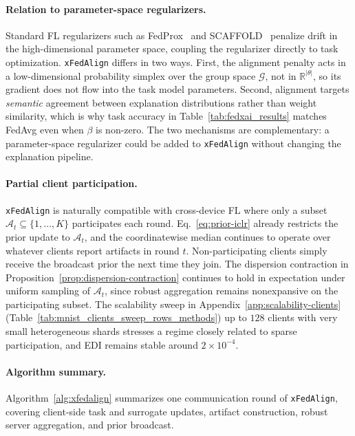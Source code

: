 \documentclass{article}
\theoremstyle{plain}
\theoremstyle{definition}
\theoremstyle{remark}
\begin{document}
\paragraph{Relation to parameter-space regularizers.}
Standard FL regularizers such as FedProx~\citep{li2020federated} and SCAFFOLD~\citep{karimireddy2019scaffold} penalize drift in the high-dimensional parameter space, coupling the regularizer directly to task optimization. \texttt{xFedAlign} differs in two ways. First, the alignment penalty acts in a low-dimensional probability simplex over the group space $\mathcal{G}$, not in $\mathbb{R}^{|\theta|}$, so its gradient does not flow into the task model parameters. Second, alignment targets \emph{semantic} agreement between explanation distributions rather than weight similarity, which is why task accuracy in Table~\ref{tab:fedxai_results} matches FedAvg even when $\beta$ is non-zero. The two mechanisms are complementary: a parameter-space regularizer could be added to \texttt{xFedAlign} without changing the explanation pipeline.

\paragraph{Partial client participation.}
\texttt{xFedAlign} is naturally compatible with cross-device FL where only a subset $\mathcal{A}_t \subseteq \{1,\dots,K\}$ participates each round. Eq.~\eqref{eq:prior-iclr} already restricts the prior update to $\mathcal{A}_t$, and the coordinatewise median continues to operate over whatever clients report artifacts in round $t$. Non-participating clients simply receive the broadcast prior the next time they join. The dispersion contraction in Proposition~\ref{prop:dispersion-contraction} continues to hold in expectation under uniform sampling of $\mathcal{A}_t$, since robust aggregation remains nonexpansive on the participating subset. The scalability sweep in Appendix~\ref{app:scalability-clients} (Table~\ref{tab:mnist_clients_sweep_rows_methods}) up to $128$ clients with very small heterogeneous shards stresses a regime closely related to sparse participation, and EDI remains stable around $2\times 10^{-4}$.


\paragraph{Algorithm summary.}
Algorithm~\ref{alg:xfedalign} summarizes one communication round of \texttt{xFedAlign}, covering client-side task and surrogate updates, artifact construction, robust server aggregation, and prior broadcast.
\end{document}
